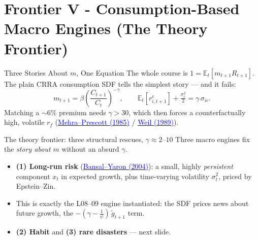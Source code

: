 \documentclass{beamer}
\newcommand{\E}{\mathbb{E}}
\newcommand{\tld}[1]{\widetilde{#1}}
\begin{document}
\section{Frontier V - Consumption-Based Macro Engines (The Theory Frontier)}

\begin{frame}{Three Stories About $m$, One Equation}
\justifying
The whole course is $1=\E_t[m_{t+1}R_{t+1}]$. The plain CRRA consumption SDF tells the simplest story --- and it fails:
\begin{equation*}
m_{t+1}=\beta\left(\frac{C_{t+1}}{C_t}\right)^{-\gamma},\qquad
\E_t[r^e_{i,t+1}]+\tfrac{\sigma_i^2}{2}=\gamma\,\sigma_{ic}.
\end{equation*}
Matching a $\sim 6\%$ premium needs $\gamma>30$, which then forces a counterfactually high, volatile $r_f$ (\href{https://www.sciencedirect.com/science/article/pii/0304393285900613}{\textcolor{blue}{Mehra--Prescott (1985)}} / \href{https://doi.org/10.1016/0304-3932(89)90028-7}{\textcolor{blue}{Weil (1989)}}).
\begin{block}{The theory frontier: three structural rescues, $\gamma\approx 2$--$10$}
Three macro engines fix the \emph{story about $m$} without an absurd $\gamma$.
\end{block}
\begin{itemize}\small
\item \textbf{(1) Long-run risk} (\href{https://doi.org/10.1111/j.1540-6261.2004.00670.x}{\textcolor{blue}{Bansal--Yaron (2004)}}): a small, highly \emph{persistent} component $x_t$ in expected growth, plus time-varying volatility $\sigma_t^2$, priced by Epstein--Zin.
\item This is exactly the L08--09 engine instantiated: the SDF prices \alert{news about future growth}, the $-(\gamma-\tfrac{1}{\psi})\,\tld{g}_{t+1}$ term.
\item \textbf{(2) Habit} and \textbf{(3) rare disasters} --- next slide.
\end{itemize}
\end{frame}
\end{document}
